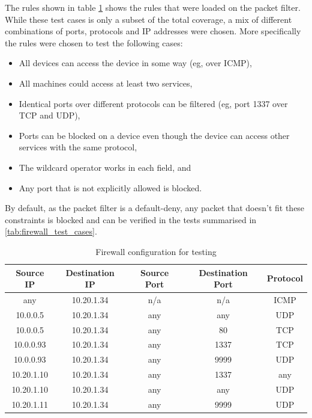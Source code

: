 The rules shown in table \ref{tab:firewall_testing_config} shows the rules that were loaded on the packet filter.  While these test cases is only a subset of the total coverage, a mix of different combinations of ports, protocols and IP addresses were chosen. More specifically the rules were chosen to test the following cases:

\begin{itemize}
    \item All devices can access the device in some way (eg, over ICMP),
    \item All machines could access at least two services,
    \item Identical ports over different protocols can be filtered (eg, port 1337 over TCP and UDP),
    \item Ports can be blocked on a device even though the device can access other services with the same protocol,
    \item The wildcard operator works in each field, and
    \item Any port that is not explicitly allowed is blocked.
\end{itemize}

By default, as the packet filter is a default-deny, any packet that doesn't fit these constraints is blocked and can be verified in the tests summarised in \ref{tab:firewall_test_cases}.


\begin{table}[h!]
    \centering
    \caption{Firewall configuration for testing}
    \label{tab:firewall_testing_config}
    \begin{tabular}{ccccc}
        \toprule
        Source IP & Destination IP & Source Port & Destination Port & Protocol \\
        \midrule
        any       & 10.20.1.34      & n/a         & n/a              & ICMP     \\
        10.0.0.5  & 10.20.1.34      & any         & any              & UDP      \\
        10.0.0.5  & 10.20.1.34      & any         & 80               & TCP      \\
        10.0.0.93 & 10.20.1.34      & any         & 1337             & TCP      \\
        10.0.0.93 & 10.20.1.34      & any         & 9999             & UDP      \\
        10.20.1.10& 10.20.1.34      & any         & 1337             & any      \\
        10.20.1.10& 10.20.1.34      & any         & any              & UDP      \\
        10.20.1.11& 10.20.1.34      & any         & 9999             & UDP      \\
        \bottomrule
    \end{tabular}
    
\end{table}

